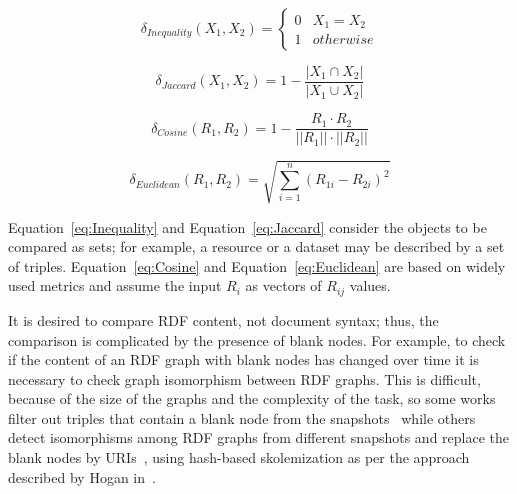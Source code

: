 \documentclass[sw]{iosart2x}
\begin{document}
\begin{equation}
\label{eq:Inequality}
\delta_{Inequality}(X_1, X_2) = 
\begin{cases} 
0 & X_1 = X_2 \\
1 & otherwise 
\end{cases}
\end{equation}

\begin{equation}
\label{eq:Jaccard}
\delta_{Jaccard}(X_1, X_2) = 1-\frac{|X_1 \cap X_2|}{|X_1 \cup X_2|}
\end{equation}

\begin{equation}
\label{eq:Cosine}
\delta_{Cosine}(R_1, R_2) = 1-\frac{R_1 \cdot R_2}{||R_1|| \cdot ||R_2||}
\end{equation}

\begin{equation}
\label{eq:Euclidean}
\delta_{Euclidean}(R_1, R_2) = \sqrt{\sum_{i=1}^n (R_{1i} - R_{2i})^2}
\end{equation}

Equation~\ref{eq:Inequality} and Equation~\ref{eq:Jaccard} consider the objects to be compared as sets; for example, a resource or a dataset may be described by a set of triples. Equation~\ref{eq:Cosine} and Equation~\ref{eq:Euclidean} are based on widely used metrics and assume the input $R_i$ as vectors of $R_{ij}$ values.

It is desired to compare RDF content, not document syntax; thus, the comparison is complicated by the presence of blank nodes. For example, to check if the content of an RDF graph with blank nodes has changed over time it is necessary to check graph isomorphism between RDF graphs. This is difficult, because of the size of the graphs and the complexity of the task, so some works filter out triples that contain a blank node from the snapshots~\cite{NishiokaS18, KaferAUOH13} while others detect isomorphisms among RDF graphs from different snapshots and replace the blank nodes by URIs~\cite{UmbrichHHPD10}, using hash-based skolemization as per the approach described by Hogan in~\cite{Hogan15}.
\end{document}
